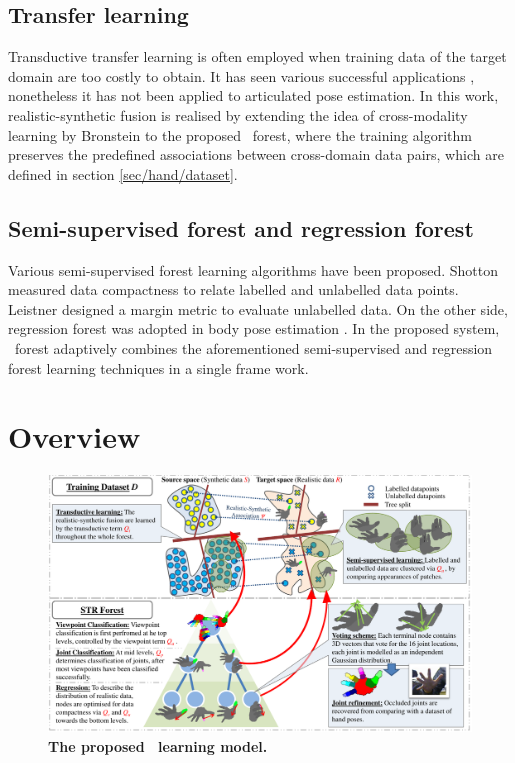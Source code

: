 \subsection{Transfer learning} 
Transductive transfer learning is often employed when training data of the target domain are too costly to obtain. 
It has seen various successful applications \cite{Pan2010}, nonetheless it has not been applied to articulated pose estimation. 
In this work, realistic-synthetic fusion is realised by extending the idea of cross-modality learning by Bronstein \etal \cite{Bronstein2010} to the proposed \STR\ forest, where the training algorithm preserves the predefined associations between cross-domain data pairs, which are defined in section \ref{sec/hand/dataset}.  

\subsection{Semi-supervised forest and regression forest} 
Various semi-supervised forest learning algorithms have been proposed. Shotton \etal \cite{Shotton2013} measured data compactness to relate labelled and unlabelled data points. Leistner \etal \cite{Leistner2009} designed a margin metric to evaluate unlabelled data. On the other side, regression forest was adopted in body pose estimation \cite{Girshick2011, Sun2012}. In the proposed system, \STR\ forest adaptively combines the aforementioned semi-supervised and regression forest learning techniques in a single frame work.

\section{Overview}

\begin{figure}[ht]
	\includegraphics[width=1.00\linewidth]{fig/hand/overview.pdf}
	\caption{\textbf{The proposed \STR\ learning model.}}
	\label{fig/hand/concept}
\end{figure}

